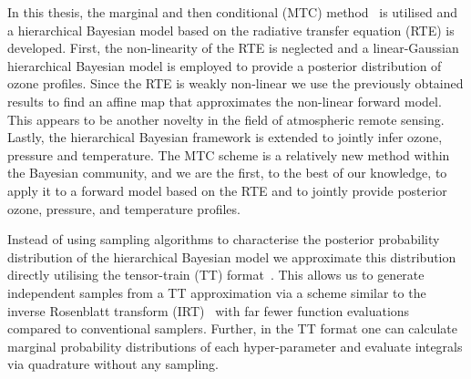 In this thesis, the marginal and then conditional (MTC) method~\cite{fox2016fast} is utilised and a hierarchical Bayesian model based on the radiative transfer equation (RTE) is developed.
First, the non-linearity of the RTE is neglected and a linear-Gaussian hierarchical Bayesian model is employed to provide a posterior distribution of ozone profiles.
Since the RTE is weakly non-linear we use the previously obtained results to find an affine map that approximates the non-linear forward model.
This appears to be another novelty in the field of atmospheric remote sensing.
Lastly, the hierarchical Bayesian framework is extended to jointly infer ozone, pressure and temperature.
The MTC scheme is a relatively new method within the Bayesian community, and we are the first, to the best of our knowledge, to apply it to a forward model based on the RTE and to jointly provide posterior ozone, pressure, and temperature profiles.

Instead of using sampling algorithms to characterise the posterior probability distribution of the hierarchical Bayesian model we approximate this distribution directly utilising the tensor-train (TT) format~\cite{cui2022deep}. 
This allows us to generate independent samples from a TT approximation via a scheme similar to the inverse Rosenblatt transform (IRT)~\cite{dolgov2020approximation} with far fewer function evaluations compared to conventional samplers.
Further, in the TT format one can calculate marginal probability distributions of each hyper-parameter and evaluate integrals via quadrature without any sampling.


